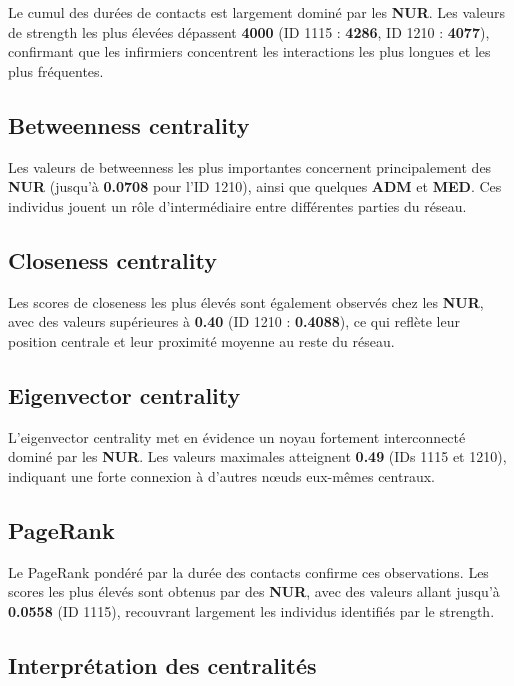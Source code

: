 \documentclass[10pt,twocolumn]{article}
\begin{document}
Le cumul des durées de contacts est largement dominé par les \textbf{NUR}.
Les valeurs de strength les plus élevées dépassent \textbf{4000}
(ID 1115 : \textbf{4286}, ID 1210 : \textbf{4077}),
confirmant que les infirmiers concentrent les interactions les plus longues
et les plus fréquentes.

\subsection{Betweenness centrality}

Les valeurs de betweenness les plus importantes concernent principalement
des \textbf{NUR} (jusqu’à \textbf{0.0708} pour l’ID 1210),
ainsi que quelques \textbf{ADM} et \textbf{MED}.
Ces individus jouent un rôle d’intermédiaire entre différentes parties du réseau.

\subsection{Closeness centrality}

Les scores de closeness les plus élevés sont également observés
chez les \textbf{NUR}, avec des valeurs supérieures à \textbf{0.40}
(ID 1210 : \textbf{0.4088}),
ce qui reflète leur position centrale et leur proximité moyenne
au reste du réseau.

\subsection{Eigenvector centrality}

L’eigenvector centrality met en évidence un noyau fortement interconnecté
dominé par les \textbf{NUR}.
Les valeurs maximales atteignent \textbf{0.49} (IDs 1115 et 1210),
indiquant une forte connexion à d’autres nœuds eux-mêmes centraux.

\subsection{PageRank}

Le PageRank pondéré par la durée des contacts confirme ces observations.
Les scores les plus élevés sont obtenus par des \textbf{NUR},
avec des valeurs allant jusqu’à \textbf{0.0558} (ID 1115),
recouvrant largement les individus identifiés par le strength.

\subsection{Interprétation des centralités}
\end{document}
